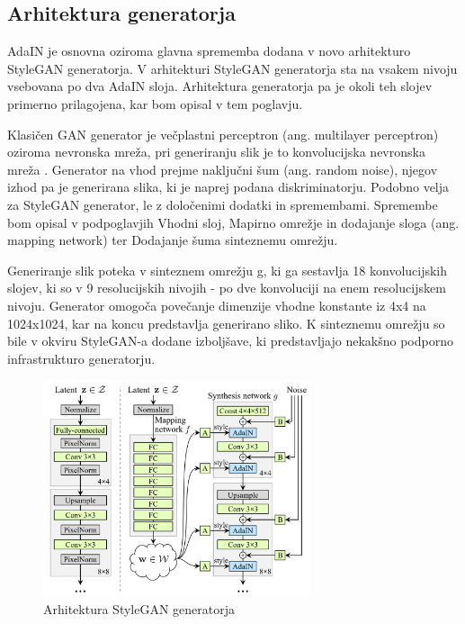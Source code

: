 \documentclass[a4paper,12pt,openright]{book}
\begin{document}
\subsection{Arhitektura generatorja}
AdaIN je osnovna oziroma glavna sprememba dodana v novo arhitekturo StyleGAN generatorja. 
V arhitekturi StyleGAN generatorja sta na vsakem nivoju vsebovana po dva AdaIN sloja. Arhitektura generatorja pa je okoli teh slojev primerno prilagojena, kar bom opisal v tem poglavju.

Klasičen GAN generator je večplastni perceptron (ang. multilayer perceptron) oziroma nevronska mreža, pri generiranju slik je to konvolucijska nevronska mreža \cite{karras2017progressive}. Generator na vhod prejme naključni šum (ang. random noise), njegov izhod pa je generirana slika, ki je naprej podana diskriminatorju. Podobno velja za StyleGAN generator, le z določenimi dodatki in spremembami. Spremembe bom opisal v podpoglavjih Vhodni sloj, Mapirno omrežje in dodajanje sloga (ang. mapping network) ter Dodajanje šuma sinteznemu omrežju.

Generiranje slik poteka v sinteznem omrežju g, ki ga sestavlja 18 konvolucijskih slojev, ki so v 9 resolucijskih nivojih - po dve konvoluciji na enem resolucijskem nivoju. Generator omogoča povečanje dimenzije vhodne konstante iz 4x4 na 1024x1024, kar na koncu predstavlja generirano sliko. K sinteznemu omrežju so bile v okviru StyleGAN-a dodane izboljšave, ki predstavljajo nekakšno podporno infrastrukturo generatorju. 


\begin{figure}[htb]
\begin{center}
  \includegraphics[width=0.7\textwidth]{images/stylegan_architecture.png}
\end{center}
  \caption{Arhitektura StyleGAN generatorja}
  \label{AdaIN}
\end{figure}
\end{document}
